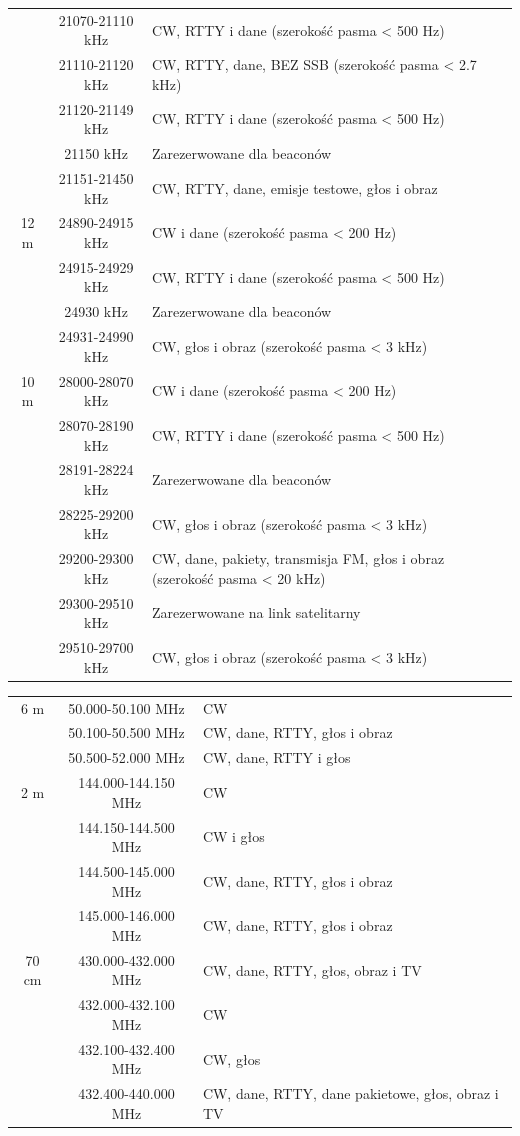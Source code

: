\documentclass[a4paper,11pt]{article}
\begin{document}
\begin{center}
\begin{tabular}{| c | c | p{8cm} |}
 & 21070-21110 kHz & CW, RTTY i dane (szerokość pasma < 500 Hz) \\ \cline{2-3}
 & 21110-21120 kHz & CW, RTTY, dane, BEZ SSB (szerokość pasma < 2.7 kHz) \\ \cline{2-3}
 & 21120-21149 kHz & CW, RTTY i dane (szerokość pasma < 500 Hz) \\ \cline{2-3}
 & 21150 kHz & Zarezerwowane dla beaconów \\ \cline{2-3}
 & 21151-21450 kHz & CW, RTTY, dane, emisje testowe, głos i obraz \\ \hline
12 m & 24890-24915 kHz & CW i dane (szerokość pasma < 200 Hz) \\ \cline{2-3}
 & 24915-24929 kHz & CW, RTTY i dane (szerokość pasma < 500 Hz) \\ \cline{2-3}
 & 24930 kHz & Zarezerwowane dla beaconów \\ \cline{2-3}
 & 24931-24990 kHz & CW, głos i obraz (szerokość pasma < 3 kHz) \\ \hline
10 m & 28000-28070 kHz & CW i dane (szerokość pasma < 200 Hz) \\ \cline{2-3}
 & 28070-28190 kHz & CW, RTTY i dane (szerokość pasma < 500 Hz) \\ \cline{2-3}
 & 28191-28224 kHz & Zarezerwowane dla beaconów \\ \cline{2-3}
 & 28225-29200 kHz & CW, głos i obraz (szerokość pasma < 3 kHz) \\ \cline{2-3}
 & 29200-29300 kHz & CW, dane, pakiety, transmisja FM, głos i obraz (szerokość pasma < 20 kHz) \\ \cline{2-3}
 & 29300-29510 kHz & Zarezerwowane na link satelitarny \\ \cline{2-3}
 & 29510-29700 kHz & CW, głos i obraz (szerokość pasma < 3 kHz) \\ \hline
\end{tabular}
\end{center}
\begin{center}
\begin{tabular}{| c | c | p{8cm} |}
\hline
6 m & 50.000-50.100 MHz & CW \\ \cline{2-3}
 & 50.100-50.500 MHz & CW, dane, RTTY, głos i obraz \\ \cline{2-3}
 & 50.500-52.000 MHz & CW, dane, RTTY i głos \\ \hline
2 m & 144.000-144.150 MHz & CW \\ \cline{2-3}
 & 144.150-144.500 MHz & CW i głos \\ \cline{2-3}
 & 144.500-145.000 MHz & CW, dane, RTTY, głos i obraz \\ \cline{2-3}
 & 145.000-146.000 MHz & CW, dane, RTTY, głos i obraz \\ \hline
70 cm & 430.000-432.000 MHz & CW, dane, RTTY, głos, obraz i TV \\ \cline{2-3}
 & 432.000-432.100 MHz & CW \\ \cline{2-3}
 & 432.100-432.400 MHz & CW, głos \\ \cline{2-3}
 & 432.400-440.000 MHz & CW, dane, RTTY, dane pakietowe, głos, obraz i TV \\ \hline
\end{tabular}
\end{center}
\end{document}
